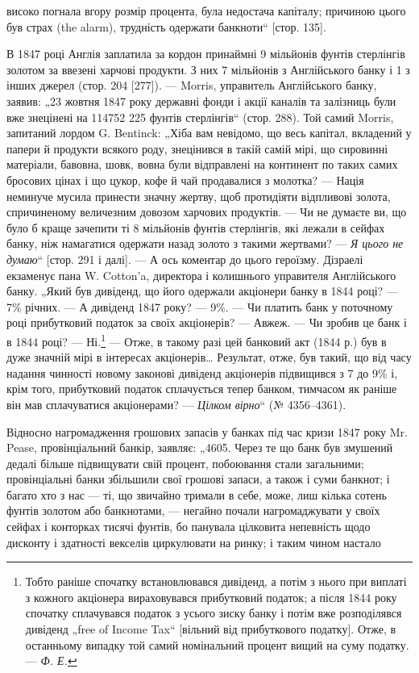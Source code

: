 \parcont{}  %
високо погнала вгору розмір процента, була недостача капіталу;
причиною цього був страх (the alarm), трудність одержати банкноти“ [стор. 135].

В 1847 році Англія заплатила за кордон принаймні 9 мільйонів фунтів стерлінгів золотом за ввезені
харчові продукти.
З них 7 мільйонів з Англійського банку і 1 з інших джерел
(стор. 204 [277]). — Morris, управитель Англійського банку, заявив:
„23 жовтня 1847 року державні фонди і акції каналів та залізниць
були вже знецінені на 114752 225 фунтів стерлінгів“ (стор. 288).
Той самий Morris, запитаний лордом G. Bentinck: „Хіба вам невідомо, що весь капітал, вкладений у
папери й продукти всякого роду, знецінився в такій самій мірі, що сировинні матеріали,
бавовна, шовк, вовна були відправлені на континент по таких самих
бросових цінах і що цукор, кофе й чай продавалися з молотка? —
Нація неминуче мусила принести значну жертву, щоб протидіяти
відпливові золота, спричиненому величезним довозом харчових
продуктів. — Чи не думаєте ви, що було б краще зачепити ті
8 мільйонів фунтів стерлінгів, які лежали в сейфах банку, ніж
намагатися одержати назад золото з такими жертвами? — \emph{Я цього
не думаю}“ [стор. 291 і далі]. — А ось коментар до цього героїзму. Дізраелі екзаменує пана W.
Cotton’a, директора і колишнього
управителя Англійського банку. „Який був дивіденд, що його
одержали акціонери банку в 1844 році? — 7\% річних. — А дивіденд 1847 року? — 9\%. — Чи платить банк у
поточному році прибутковий податок за своїх акціонерів? — Авжеж. — Чи зробив
це банк і в 1844 році? — Ні.\footnote{
Тобто раніше спочатку встановлювався дивіденд, а потім з нього при
виплаті з кожного акціонера вираховувався прибутковий податок; а після
1844 року спочатку сплачувався податок з усього зиску банку і потім вже
розподілявся дивіденд „free of Income Tax“ [вільний від прибуткового податку].
Отже, в останньому випадку той самий номінальний процент вищий на суму
податку. — \emph{Ф. Е.}
} — Отже, в такому разі цей банковий
акт (1844 р.) був в дуже значній мірі в інтересах акціонерів\dots{}
Результат, отже, був такий, що від часу надання чинності новому законові дивіденд акціонерів
підвищився з 7 до 9\% і,
крім того, прибутковий податок сплачується тепер банком, тимчасом як раніше він мав сплачуватися
акціонерами? — \emph{Цілком
вірно}“ (№ 4356--4361).

Відносно нагромадження грошових запасів у банках під час
кризи 1847 року Mr. Pease, провінціальний банкір, заявляє: „4605.
Через те що банк був змушений дедалі більше підвищувати
свій процент, побоювання стали загальними; провінціальні банки
збільшили свої грошові запаси, а також і суми банкнот; і багато хто з нас — ті, що звичайно тримали
в себе, може, лиш
кілька сотень фунтів золотом або банкнотами, — негайно почали нагромаджувати у своїх сейфах і
конторках тисячі фунтів, бо панувала цілковита непевність щодо дисконту і здатності векселів
циркулювати на ринку; і таким чином настало
\parbreak{}  %
